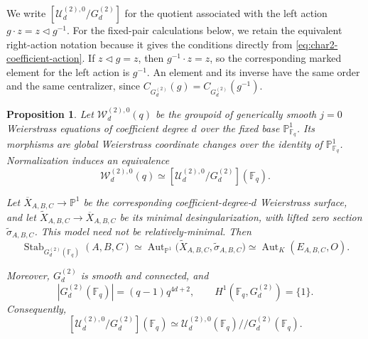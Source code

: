 \documentclass[a4paper,12pt]{amsart}
\newtheorem{prop}[thm]{Proposition}
\theoremstyle{definition}
\newcommand{\cU}{\mathcal{U}}
\newcommand{\cW}{\mathcal{W}}
\newcommand{\Fb}{\mathbb{F}}
\newcommand{\Pb}{\mathbb{P}}
\newcommand{\Aut}{\operatorname{Aut}}
\begin{document}
We write $[\cU_d^{(2),0}/G_d^{(2)}]$ for the quotient associated with the left action $g\cdot z=z\mathbin{\triangleleft}g^{-1}$.  For the fixed-pair calculations below, we retain the equivalent right-action notation because it gives the conditions directly from \eqref{eq:char2-coefficient-action}.  If $z\mathbin{\triangleleft}g=z$, then $g^{-1}\cdot z=z$, so the corresponding marked element for the left action is $g^{-1}$.  An element and its inverse have the same order and the same centralizer, since $C_{G_d^{(2)}}(g)=C_{G_d^{(2)}}(g^{-1})$.

\begin{prop}
\label{prop:char2-normalized-quotient}
Let $\cW_d^{(2),0}(q)$ be the groupoid of generically smooth $j=0$ Weierstrass equations of coefficient degree $d$ over the fixed base $\Pb^1_{\Fb_q}$.  Its morphisms are global Weierstrass coordinate changes over the identity of $\Pb^1_{\Fb_q}$.  Normalization induces an equivalence
\[
\cW_d^{(2),0}(q)
\simeq
[\cU_d^{(2),0}/G_d^{(2)}](\Fb_q).
\]

Let $\overline X_{A,B,C}\to\Pb^1$ be the corresponding coefficient-degree-$d$ Weierstrass surface, and let $\widetilde X_{A,B,C}\to\overline X_{A,B,C}$ be its minimal desingularization, with lifted zero section $\widetilde\sigma_{A,B,C}$.  This model need not be relatively-minimal.  Then
\[
\operatorname{Stab}_{G_d^{(2)}(\Fb_q)}(A,B,C)
\simeq
\Aut_{\Pb^1}\bigl(\widetilde X_{A,B,C},\widetilde\sigma_{A,B,C}\bigr)
\simeq
\Aut_K(E_{A,B,C},O).
\]

Moreover, $G_d^{(2)}$ is smooth and connected, and
\begin{equation}\label{eq:char2-group-size}
|G_d^{(2)}(\Fb_q)|=(q-1)q^{4d+2},
\qquad
H^1(\Fb_q,G_d^{(2)})=\{1\}.
\end{equation}
Consequently,
\[
[\cU_d^{(2),0}/G_d^{(2)}](\Fb_q)
\simeq
\cU_d^{(2),0}(\Fb_q)\mathbin{//}G_d^{(2)}(\Fb_q).
\]
\end{prop}
\end{document}
